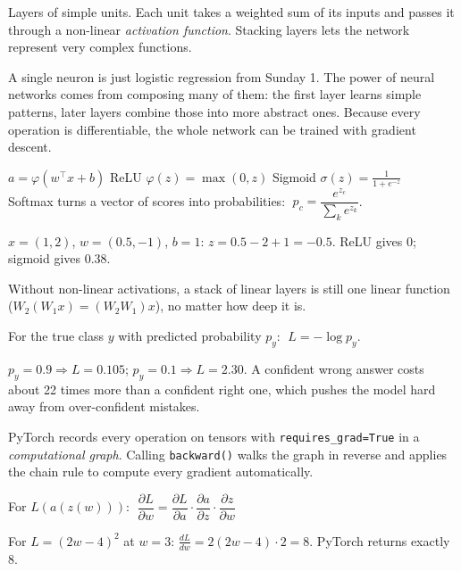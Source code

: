 \documentclass[11pt,a4paper]{article}
\begin{document}
\begin{bdef}
Layers of simple units. Each unit takes a weighted sum of its inputs and passes it through a non-linear \emph{activation function}. Stacking layers lets the network represent very complex functions.
\end{bdef}
A single neuron is just logistic regression from Sunday 1. The power of neural networks comes from composing many of them: the first layer learns simple patterns, later layers combine those into more abstract ones. Because every operation is differentiable, the whole network can be trained with gradient descent.
\begin{bmath}
$a=\varphi(w^\top x+b)$ \qquad ReLU $\varphi(z)=\max(0,z)$ \qquad Sigmoid $\sigma(z)=\frac{1}{1+e^{-z}}$\\[3pt]
Softmax turns a vector of scores into probabilities: $\;p_c=\dfrac{e^{z_c}}{\sum_{k}e^{z_k}}$.
\end{bmath}
\begin{bex}
$x=(1,2)$, $w=(0.5,-1)$, $b=1$: $z=0.5-2+1=-0.5$. ReLU gives $0$; sigmoid gives $0.38$.
\end{bex}
\begin{bwarn}
Without non-linear activations, a stack of linear layers is still one linear function ($W_2(W_1x)=(W_2W_1)x$), no matter how deep it is.
\end{bwarn}

\begin{bmath}
For the true class $y$ with predicted probability $p_y$: $\;L=-\log p_y$.
\end{bmath}
\begin{bex}
$p_y=0.9\Rightarrow L=0.105$; \;$p_y=0.1\Rightarrow L=2.30$. A confident wrong answer costs about 22 times more than a confident right one, which pushes the model hard away from over-confident mistakes.
\end{bex}
\begin{bdef}[Autograd]
PyTorch records every operation on tensors with \texttt{requires\_grad=True} in a \emph{computational graph}. Calling \texttt{backward()} walks the graph in reverse and applies the chain rule to compute every gradient automatically.
\end{bdef}
\begin{bmath}
For $L(a(z(w)))$: $\;\dfrac{\partial L}{\partial w}=\dfrac{\partial L}{\partial a}\cdot\dfrac{\partial a}{\partial z}\cdot\dfrac{\partial z}{\partial w}$
\end{bmath}
\begin{bex}
For $L=(2w-4)^2$ at $w=3$: $\frac{dL}{dw}=2(2w-4)\cdot2=8$. PyTorch returns exactly 8.
\end{bex}
\end{document}
